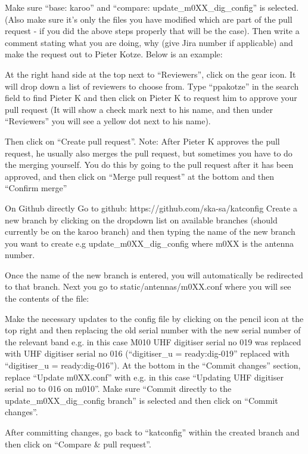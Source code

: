 Make sure “base: karoo” and “compare: update_m0XX_dig_config” is selected. (Also make sure it’s only the files you have modified which are part of the pull request - if you did the above steps properly that will be the case).
Then write a comment stating what you are doing, why (give Jira number if applicable) and make the request out to Pieter Kotze. Below is an example:


At the right hand side at the top next to “Reviewers”, click on the gear icon. It will drop down a list of reviewers to choose from. Type “ppakotze” in the search field to find Pieter K and then click on Pieter K to request him to approve your pull request (It will show a check mark next to his name, and then under “Reviewers” you will see a yellow dot next to his name).

Then click on “Create pull request”.
Note: After Pieter K approves the pull request, he usually also merges the pull request, but sometimes you have to do the merging yourself. You do this by going to the pull request after it has been approved, and then click on “Merge pull request” at the bottom and then “Confirm merge”


On Github directly
Go to github: https://github.com/ska-sa/katconfig
Create a new branch by clicking on the dropdown list on available branches (should currently be on the karoo branch) and then typing the name of the new branch you want to create e.g update_m0XX_dig_config where m0XX is the antenna number.



Once the name of the new branch is entered, you will automatically be redirected to that branch.
Next you go to static/antennas/m0XX.conf where you will see the contents of the file:

Make the necessary updates to the config file by clicking on the pencil icon at the top right and then replacing the old serial number with the new serial number of the relevant band e.g. in this case M010 UHF digitiser serial no 019 was replaced with UHF digitiser serial no 016 (“digitiser_u = ready:dig-019” replaced with “digitiser_u = ready:dig-016”).
At the bottom in the “Commit changes” section, replace “Update m0XX.conf” with e.g. in this case “Updating UHF digitiser serial no to 016 on m010”. Make sure “Commit directly to the update_m0XX_dig_config branch” is selected and then click on “Commit changes”.

After committing changes, go back to “katconfig” within the created branch and then click on “Compare & pull request”.


